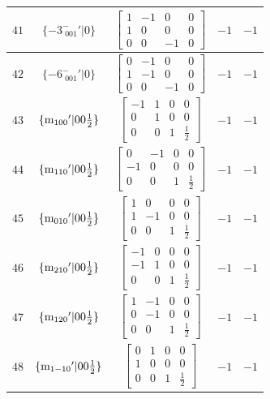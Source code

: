 \documentclass[fleqn,8pt]{jsarticle}
\begin{document}
\begin{longtable}{ccccc}
$ 41 $ & $ \{-3^{-}_{\,\,001}{}'|0\} $ & $ \begin{bmatrix} 1 & -1 & 0 & 0 \\ 1 & 0 & 0 & 0 \\ 0 & 0 & -1 & 0 \end{bmatrix} $ & $ -1 $ & $ -1 $ \\ \hline
$ 42 $ & $ \{-6^{-}_{\,\,001}{}'|0\} $ & $ \begin{bmatrix} 0 & -1 & 0 & 0 \\ 1 & -1 & 0 & 0 \\ 0 & 0 & -1 & 0 \end{bmatrix} $ & $ -1 $ & $ -1 $ \\ \hline
$ 43 $ & $ \{{\rm m}_{100}{}'|0 0 \frac{1}{2}\} $ & $ \begin{bmatrix} -1 & 1 & 0 & 0 \\ 0 & 1 & 0 & 0 \\ 0 & 0 & 1 & \frac{1}{2} \end{bmatrix} $ & $ -1 $ & $ -1 $ \\ \hline
$ 44 $ & $ \{{\rm m}_{110}{}'|0 0 \frac{1}{2}\} $ & $ \begin{bmatrix} 0 & -1 & 0 & 0 \\ -1 & 0 & 0 & 0 \\ 0 & 0 & 1 & \frac{1}{2} \end{bmatrix} $ & $ -1 $ & $ -1 $ \\ \hline
$ 45 $ & $ \{{\rm m}_{010}{}'|0 0 \frac{1}{2}\} $ & $ \begin{bmatrix} 1 & 0 & 0 & 0 \\ 1 & -1 & 0 & 0 \\ 0 & 0 & 1 & \frac{1}{2} \end{bmatrix} $ & $ -1 $ & $ -1 $ \\ \hline
$ 46 $ & $ \{{\rm m}_{210}{}'|0 0 \frac{1}{2}\} $ & $ \begin{bmatrix} -1 & 0 & 0 & 0 \\ -1 & 1 & 0 & 0 \\ 0 & 0 & 1 & \frac{1}{2} \end{bmatrix} $ & $ -1 $ & $ -1 $ \\ \hline
$ 47 $ & $ \{{\rm m}_{120}{}'|0 0 \frac{1}{2}\} $ & $ \begin{bmatrix} 1 & -1 & 0 & 0 \\ 0 & -1 & 0 & 0 \\ 0 & 0 & 1 & \frac{1}{2} \end{bmatrix} $ & $ -1 $ & $ -1 $ \\ \hline
$ 48 $ & $ \{{\rm m}_{1-10}{}'|0 0 \frac{1}{2}\} $ & $ \begin{bmatrix} 0 & 1 & 0 & 0 \\ 1 & 0 & 0 & 0 \\ 0 & 0 & 1 & \frac{1}{2} \end{bmatrix} $ & $ -1 $ & $ -1 $ \\
\end{longtable}
\end{document}
